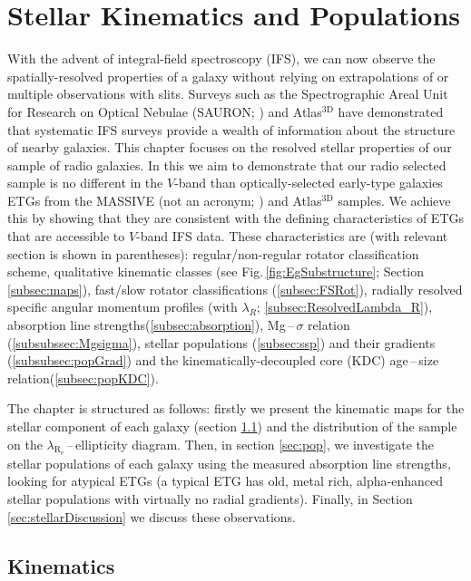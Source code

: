 \chapter{Stellar Kinematics and Populations}
	\label{cha:stellar}
With the advent of integral-field spectroscopy (IFS), we can now observe the spatially-resolved properties of a galaxy without relying on extrapolations of or multiple observations with slits. Surveys such as the Spectrographic Areal Unit for Research on Optical Nebulae (SAURON; \citealt{deZeeuw2002}) and Atlas$^\text{3D}$ \citep{Cappellari2011} have demonstrated that systematic IFS surveys provide a wealth of information about the structure of nearby galaxies. This chapter focuses on the resolved stellar properties of our sample of radio galaxies. In this we aim to demonstrate that our radio selected sample is no different in the $V$-band than optically-selected early-type galaxies ETGs from the MASSIVE (not an acronym; \citealt{Ma2014}) and Atlas$^\text{3D}$ samples. We achieve this by showing that they are consistent with the defining characteristics of ETGs that are accessible to $V$-band IFS data. These characteristics are (with relevant section is shown in parentheses): regular/non-regular rotator classification scheme, qualitative kinematic classes (see Fig.\,\ref{fig:EgSubstructure}; Section \ref{subsec:maps}), fast/slow rotator classifications (\ref{subsec:FSRot}), radially resolved specific angular momentum profiles (with $\lambda_R$; \ref{subsec:ResolvedLambda_R}), absorption line strengths(\ref{subsec:absorption}), Mg\,--\,$\sigma$ relation (\ref{subsubssec:Mgsigma}), stellar populations (\ref{subsec:ssp}) and their gradients (\ref{subsubsec:popGrad}) and the kinematically-decoupled core (KDC) age\,--\,size relation(\ref{subsec:popKDC}). 

The chapter is structured as follows: firstly we present the kinematic maps for the stellar component of each galaxy (section \ref{sec:stellarKin}) and the distribution of the sample on the $\lambda_\mathrm{R_e}$\,--\,ellipticity diagram. Then, in section \ref{sec:pop}, we investigate the stellar populations of each galaxy using the measured absorption line strengths, looking for atypical ETGs (a typical ETG has old, metal rich, alpha-enhanced stellar populations with virtually no radial gradients). Finally, in Section \ref{sec:stellarDiscussion} we discuss these observations.


\section{Kinematics}
	\label{sec:stellarKin}

